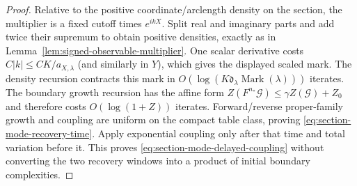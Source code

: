 \documentclass[11pt]{article}
\begin{document}
\begin{proof}
Relative to the positive coordinate/arclength density on the section, the
multiplier is a fixed cutoff times $e^{ikX}$.  Split real and imaginary parts
and add twice their supremum to obtain positive densities, exactly as in
Lemma~\ref{lem:signed-observable-multiplier}.  One scalar derivative costs
$C|k|\le CK/a_{X,\lambda}$ (and similarly in $Y$), which gives the displayed
scaled mark.  The density recursion contracts this mark in
$O(\log(K\mathfrak d_\lambda\operatorname{Mark}(\lambda)))$ iterates.  The
boundary growth recursion has the affine form
$Z(F^{n_*}\mathcal G)\le\gamma Z(\mathcal G)+Z_0$ and therefore costs
$O(\log(1+Z))$ iterates.  Forward/reverse proper-family growth and coupling
are uniform on the compact table class, proving
\eqref{eq:section-mode-recovery-time}.  Apply exponential coupling only after
that time and total variation before it.  This proves
\eqref{eq:section-mode-delayed-coupling} without converting the two recovery
windows into a product of initial boundary complexities.
\end{proof}
\end{document}

